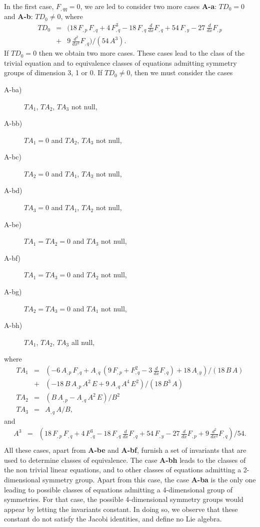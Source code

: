 In the first case, $F_{,qq}=0$, we are led to consider two more cases 
{\bf A-a}: $TD_{0}=0$ and {\bf A-b}: $TD_{0} \neq 0$, where 
\begin{eqnarray}
\label{TD0}
TD_{0}&=&(18\,F_{,p}\,F_{,q} + 4\,F_{,q}^{3} 
- 18\,F_{,q}\,\frac{d}{dx}F_{,q} + 54\,F_{,y} 
- 27\,\frac{d}{dx}F_{,p} \nonumber \\
&+& 9\,\frac{d^{2}}{dx^{2}}F_{,q})/(54\,A^{3}).
\end{eqnarray}
If $TD_{0}=0$ then we obtain two more cases. These cases lead to the class 
of the trivial equation and to equivalence classes of equations admitting 
symmetry groups of dimension 3, 1 or 0. If $TD_{0} \neq 0$, then we 
must consider the cases
\begin{description}
\item[A-ba)] $TA_{1}$, $TA_{2}$, $TA_{3}$ not null,
\item[A-bb)] $TA_{1}=0$ and $TA_{2}$, $TA_{3}$ not null,
\item[A-bc)] $TA_{2}=0$ and $TA_{1}$, $TA_{3}$ not null,
\item[A-bd)] $TA_{3}=0$ and $TA_{1}$, $TA_{2}$ not null, 
\item[A-be)] $TA_{1}=TA_{2}=0$ and $TA_{3}$ not null,
\item[A-bf)] $TA_{1}=TA_{3}=0$ and $TA_{2}$ not null, 
\item[A-bg)] $TA_{2}=TA_{3}=0$ and $TA_{1}$ not null, 
\item[A-bh)] $TA_{1}$, $TA_{2}$, $TA_{3}$ all null,
\end{description}
where 
\begin{eqnarray}
\label{A_bTA1}
TA_{1}&=&( - 6\,A_{,p}\,F_{,q} + A_{,q}\,(9\,F_{,p} + F_{,q}^{2} 
- 3\,\frac{d}{dx}F_{,q}) + 18\,A_{,y})/(18\,B\,A) 
\nonumber \\
&+& ( - 18\,B\,A_{,p}\,A^{2}\,E + 9\,A_{,q}\,A^{4}\,E^{2})/(18\,B^{3}\,A) \\
\label{A_bTA2}
TA_{2}&=&(B\,A_{,p} - A_{,q}\,A^{2}\,E)/B^{2} \\
\label{A_bTA3}
TA_{3}&=&A_{,q}\,A/B,
\end{eqnarray}
and 
\begin{eqnarray}
\label{1A_bA3}
A^{3}&=&(18\,F_{,p}\,F_{,q} + 4\,F_{,q}^{3} - 18\,F_{,q}\,\frac{d}{dx}F_{,q}
+ 54\,F_{,y} - 27\,\frac{d}{dx}F_{,p} + 9\,\frac{d^{2}}{dx^{2}}F_{,q})/54. 
\nonumber \\ && 
\end{eqnarray}
All these cases, apart from {\bf A-be} and {\bf A-bf}, furnish a set of 
invariants 
that are used to determine classes of equivalence. The case {\bf A-bh} leads
 to the classes of the non trivial linear equations, and to other classes 
of equations admitting a 2-dimensional symmetry group. Apart from this case, 
the case {\bf A-ba} is the only one leading to possible 
classes of equations admitting a 4-dimensional group of symmetries. For that 
case, the possible 4-dimensional symmetry groups would appear by letting 
the invariants constant. In doing so, we observe that these constant do not 
satisfy the Jacobi identities, and define no Lie algebra.

